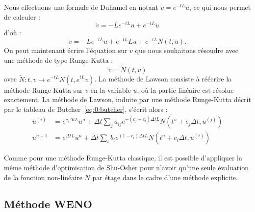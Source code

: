 Nous effectuons une formule de Duhamel en notant $v = e^{-tL}u$, ce qui nous permet de calculer :
$$
  \dot{v} = -Le^{-tL}u + e^{-tL}\dot{u}
$$
d'où :
$$
  \dot{v} = -Le^{-tL}u + e^{-tL}Lu + e^{-tL}N(t,u).
$$
On peut maintenant écrire l'équation sur $v$ que nous souhaitons résoudre avec une méthode de type Runge-Kutta :
$$
  \dot{v} = \tilde{N}(t,v)
$$
avec $\tilde{N}:t,v\mapsto e^{-tL}N(t,e^{tL}v)$. La méthode de Lawson consiste à réécrire la méthode Runge-Kutta sur $v$ en la variable $u$, où la partie linéaire est résolue exactement. La méthode de Lawson, induite par une méthode Runge-Kutta décrit par le tableau de Butcher~\eqref{eq:0:butcher}, s'écrit alors :
$$
  \begin{aligned}
    u^{(i)} &= e^{c_i\Delta t L}u^n + \Delta t \sum_j a_{ij}e^{-(c_j-c_i)\Delta t L}N(t^n+c_j\Delta t,u^{(j)}) \\
    u^{n+1} &= e^{\Delta t L}u^n + \Delta t \sum_i b_i e^{(1-c_i)\Delta tL} N(t^n+c_i\Delta t,u^{(i)})
  \end{aligned}
$$

Comme pour une méthode Runge-Kutta classique, il est possible d'appliquer la même méthode d'optimisation de Shu-Osher pour n'avoir qu'une seule évaluation de la fonction non-linéaire $N$ par étage dans le cadre d'une méthode explicite.


\subsection{Méthode WENO}


